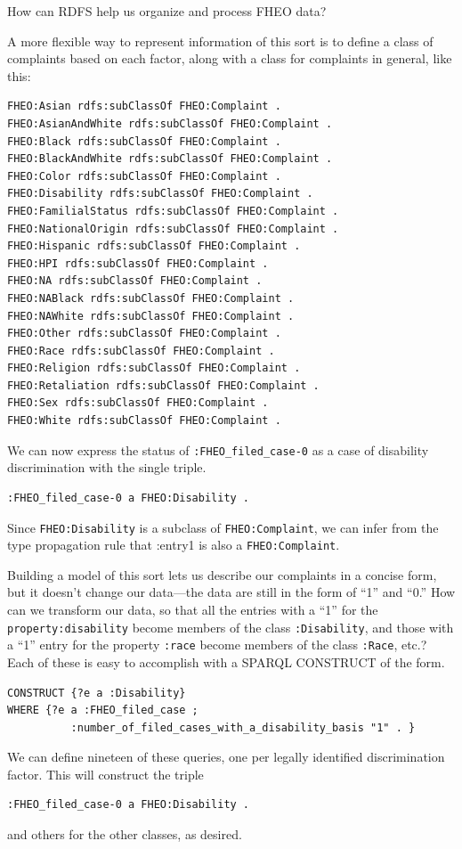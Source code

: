 \begin{challenge}{How can RDFS help us organize and process FHEO data?}

\solution

A more flexible way to represent information of this sort is to define a
class of complaints based on each factor, along with a class for
complaints in general, like this:

\begin{lstlisting}
FHEO:Asian rdfs:subClassOf FHEO:Complaint .
FHEO:AsianAndWhite rdfs:subClassOf FHEO:Complaint .
FHEO:Black rdfs:subClassOf FHEO:Complaint .
FHEO:BlackAndWhite rdfs:subClassOf FHEO:Complaint .
FHEO:Color rdfs:subClassOf FHEO:Complaint .
FHEO:Disability rdfs:subClassOf FHEO:Complaint .
FHEO:FamilialStatus rdfs:subClassOf FHEO:Complaint .
FHEO:NationalOrigin rdfs:subClassOf FHEO:Complaint .
FHEO:Hispanic rdfs:subClassOf FHEO:Complaint .
FHEO:HPI rdfs:subClassOf FHEO:Complaint .
FHEO:NA rdfs:subClassOf FHEO:Complaint .
FHEO:NABlack rdfs:subClassOf FHEO:Complaint .
FHEO:NAWhite rdfs:subClassOf FHEO:Complaint .
FHEO:Other rdfs:subClassOf FHEO:Complaint .
FHEO:Race rdfs:subClassOf FHEO:Complaint .
FHEO:Religion rdfs:subClassOf FHEO:Complaint .
FHEO:Retaliation rdfs:subClassOf FHEO:Complaint .
FHEO:Sex rdfs:subClassOf FHEO:Complaint .
FHEO:White rdfs:subClassOf FHEO:Complaint .
\end{lstlisting}

We can now express the status of \texttt{:FHEO\_filed\_case-0} as a case of disability
discrimination with the single triple.

\begin{lstlisting}
:FHEO_filed_case-0 a FHEO:Disability .
\end{lstlisting}

Since \texttt{FHEO:Disability} is a subclass of \texttt{FHEO:Complaint}, we can infer from
the type propagation rule that :entry1 is also a \texttt{FHEO:Complaint}.

Building a model of this sort lets us describe our complaints in a
concise form, but it doesn't change our data---the data are still in the
form of ``1'' and ``0.'' How can we transform our data, so that all the
entries with a ``1'' for the \texttt{property:disability} become members of the
class \texttt{:Disability}, and those with a ``1'' entry for the property \texttt{:race}
become members of the class \texttt{:Race}, etc.? Each of these is easy to
accomplish with a SPARQL CONSTRUCT of the form.

\begin{lstlisting}
CONSTRUCT {?e a :Disability}
WHERE {?e a :FHEO_filed_case ;
          :number_of_filed_cases_with_a_disability_basis "1" . }
\end{lstlisting}

We can define nineteen of these queries, one per legally identified
discrimination factor. This will construct the triple

\begin{lstlisting}
:FHEO_filed_case-0 a FHEO:Disability .
\end{lstlisting}

and others for the other classes, as desired.
\end{challenge}

